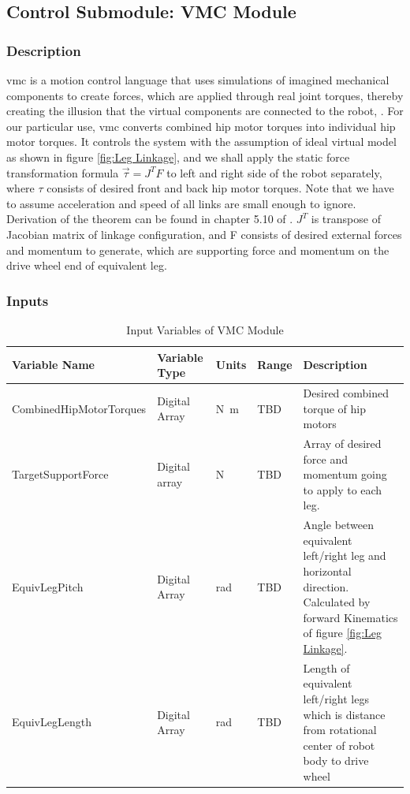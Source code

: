 \documentclass[12pt]{article}
\begin{document}
    \subsection{Control Submodule: VMC Module}
        \subsubsection{Description}            
            \acrfull{vmc} is a motion control language that uses simulations of imagined mechanical components to create forces, which are applied through real joint torques, thereby creating the illusion that the virtual components are connected to the robot, \cite{VmcForBiped}. For our particular use, \acrshort{vmc} converts combined hip motor torques into individual hip motor torques. It controls the system with the assumption of ideal virtual model as shown in figure \ref{fig:Leg Linkage}, and we shall apply the static force transformation formula $\vec{\tau}=J^T F$ to left and right side of the robot separately, where $\tau$ consists of desired front and back hip motor torques. Note that we have to assume acceleration and speed of all links are small enough to ignore. Derivation of the theorem can be found in chapter 5.10 of \cite{siciliano2009robotics}. $J^T$ is transpose of Jacobian matrix of linkage configuration, and F consists of desired external forces and momentum to generate, which are supporting force and momentum on the drive wheel end of equivalent leg.
        \subsubsection{Inputs}
             \begin{table}[H]
              \centering
                \caption{Input Variables of VMC Module} \label{tbl:Input Variables of VMC Module}
                \begin{tabularx}{\textwidth}{|p{5cm}|p{2cm}|p{1.2cm}|p{1cm}|X|}
                \hline Variable Name & Variable Type & Units & Range & Description \\
                \hline CombinedHipMotorTorques     & Digital Array & \unit{N.m} & TBD & Desired combined torque of hip motors   \\
                \hline TargetSupportForce & Digital array & N & TBD & Array of desired force and momentum going to apply to each leg.\\
                \hline EquivLegPitch & Digital Array & rad & TBD & Angle between equivalent left/right leg and horizontal direction. Calculated by forward Kinematics of figure \ref{fig:Leg Linkage}.\\
                \hline EquivLegLength & Digital Array & rad & TBD & Length of equivalent left/right legs\, which is distance from rotational center of robot body to drive wheel\\
                \hline 
              \end{tabularx}
            \end{table}
        
\end{document}
